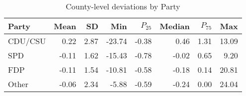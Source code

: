 \begin{table}

\caption{County-level deviations by Party}
\centering
\begin{tabular}[t]{lrrrrrrr}
\toprule
Party & Mean & SD & Min & $P_{25}$ & Median & $P_{75}$ & Max\\
\midrule
CDU/CSU & 0.22 & 2.87 & -23.74 & -0.38 & 0.46 & 1.31 & 13.09\\
SPD & -0.11 & 1.62 & -15.43 & -0.78 & -0.02 & 0.65 & 9.20\\
FDP & -0.11 & 1.54 & -10.81 & -0.58 & -0.18 & 0.14 & 20.81\\
Other & -0.06 & 2.34 & -5.88 & -0.59 & -0.24 & 0.00 & 24.04\\
\bottomrule
\end{tabular}
\end{table}